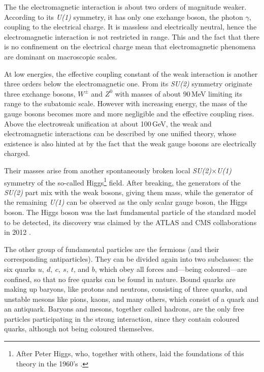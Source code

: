 The the electromagnetic interaction is about two orders of magnitude weaker.
According to its \emph{U(1)} symmetry, it has only one exchange boson, the
photon $\gamma$, coupling to the electrical charge. It is massless and
electrically neutral, hence the electromagnetic interaction is not restricted
in range. This and the fact that there is no confinement on the electrical
charge mean that electromagnetic phenomena are dominant on macroscopic scales.

At low energies, the effective coupling constant of the weak interaction is
another three orders below the electromagnetic one. From its \emph{SU(2)}
symmetry originate three exchange bosons, $W^\pm$ and $Z^0$ with masses of
about 90\,MeV limiting its range to the subatomic scale. However with increasing
energy, the mass of the gauge bosons becomes more and more negligible and the
effective coupling rises. Above the electroweak unification at about 100\,GeV,
the weak and electromagnetic interactions can be described by one unified
theory, whose existence is also hinted at by the fact that the weak gauge
bosons are electrically charged.

Their masses arise from another spontaneously
broken local \emph{SU(2)}$\times$\emph{U(1)} symmetry of the so-called
Higgs\footnote{After Peter Higgs, who, together with others, laid the
foundations of this theory in the 1960's \cite{Higgs, BroutEnglert}.} field.
After breaking, the generators of the \emph{SU(2)} part mix with the weak
bosons, giving them mass, while the generator of the remaining \emph{U(1)} can
be observed as the only scalar gauge boson, the Higgs boson. The Higgs boson
was the last fundamental particle of the standard model to be detected, its
discovery was claimed by the ATLAS and CMS collaborations in 2012
\cite{AtlasHiggs, CMSHiggs}.

The other group of fundamental particles are the fermions (and their
corresponding antiparticles). They can be divided again into two subclasses: the
six quarks $u,\ d,\ c,\ s,\ t$, and $b$, which obey all forces and---being
coloured---are confined, so that no free quarks can be found in nature. Bound
quarks are making up baryons, like protons and neutrons, consisting of three
quarks, and unstable mesons like pions, kaons, and many others, which consist of
a quark and an antiquark. Baryons and mesons, together called hadrons,
are the only free particles participating in the strong interaction, since they
contain coloured quarks, although not being coloured themselves.

